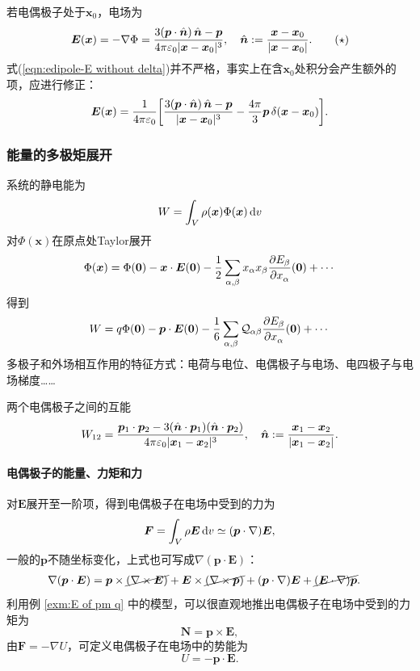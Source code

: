 若电偶极子处于$\bm x_0$，电场为 
\begin{equation}
    \label{eqn:edipole-E without delta}
    \bm E(\bm x)=-\nabla\Phi=\frac{3(\bm p\cdot\mathop{}\!\hat{\bm n})\mathop{}\!\hat{\bm n}-\bm p}{4\pi\varepsilon_0|\bm x-\bm x_0|^3},\quad \mathop{}\!\hat{\bm n}:=\frac{\bm x-\bm x_0}{|\bm x-\bm x_0|}.
    \tag{$\star$}
\end{equation}
式(\ref{eqn:edipole-E without delta})并不严格，事实上在含$\bm x_0$处积分会产生额外的项，应进行修正：
\begin{equation}
    \label{eqn:edipole-E with delta}
    \bm E(\bm x)=\frac1{4\pi\varepsilon_0}\biggl[\frac{3(\bm p\cdot\mathop{}\!\hat{\bm n})\mathop{}\!\hat{\bm n}-\bm p}{|\bm x-\bm x_0|^3}-\frac{4\pi}3\bm p\mathop{}\!\delta(\bm x-\bm x_0)\biggr].
\end{equation}
\subsubsection{能量的多极矩展开}
系统的静电能为
\[
    W=\int_V\rho(\bm x)\Phi(\bm x)\mathop{}\!\mathrm{d} v
\]
对$\Phi(\bm x)$在原点处Taylor展开
\[
    \Phi(\bm x)=\Phi(\bm 0)-\bm x\cdot\bm E(\bm 0)-\frac12\sum_{\alpha,\beta}x_\alpha x_\beta\frac{\partial^{\;\!\!}E_\beta}{\partial x_\alpha^{\;\!\!}}(\bm 0)+\cdots
\]
得到 
\begin{equation}
    W=q\Phi(\bm 0)-\bm p\cdot\bm E(\bm 0)-\frac16\sum_{\alpha,\beta}\mathcal Q_{\alpha\beta}\frac{\partial^{\;\!\!}E_\beta}{\partial x_\alpha^{\;\!\!}}(\bm 0)+\cdots
\end{equation}
多极子和外场相互作用的特征方式：电荷与电位、电偶极子与电场、电四极子与电场梯度……

两个电偶极子之间的互能
\begin{equation}
    W_{12}=\frac{\bm p_1\cdot\bm p_2-3(\mathop{}\!\hat{\bm n}\cdot\bm p_1)(\mathop{}\!\hat{\bm n}\cdot\bm p_2)}{4\pi\varepsilon_0|\bm x_1-\bm x_2|^3},\quad\mathop{}\!\hat{\bm n}:=\frac{\bm x_1-\bm x_2}{|\bm x_1-\bm x_2|}.
\end{equation}
\paragraph{电偶极子的能量、力矩和力}对$\bm E$展开至一阶项，得到电偶极子在电场中受到的力为
\begin{equation}
    \bm F=\int_V\rho\bm E\mathop{}\!\mathrm{d} v\simeq(\bm p\cdot\nabla)\bm E,
\end{equation}
一般的$\bm p$不随坐标变化，上式也可写成$\nabla(\bm p\cdot\bm E)$： 
\begin{align*}
    \nabla(\bm p\cdot\bm E)&=\bm p\times\cancel{(\nabla\times\bm E)}+\bm E\times\cancel{(\nabla\times\bm p)}+(\bm p\cdot\nabla)\bm E+\cancel{(\bm E\cdot\nabla)\bm p}.
\end{align*}
利用例 \ref{exm:E of pm q} 中的模型，可以很直观地推出电偶极子在电场中受到的力矩为
\begin{equation}
    \bm N=\bm p\times\bm E,
\end{equation}
由$\bm F=-\nabla U$，可定义电偶极子在电场中的势能为
\begin{equation}
    U=-\bm p\cdot\bm E.
\end{equation}

